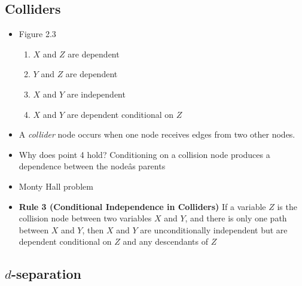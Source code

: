 \documentclass[]{article}
\providecommand{\tightlist}{%
  \setlength{\itemsep}{0pt}\setlength{\parskip}{0pt}}
\begin{document}
\subsection{Colliders}\label{colliders}

\begin{itemize}
\item
  Figure 2.3

  \begin{enumerate}
  \def\labelenumi{\arabic{enumi}.}
  \tightlist
  \item
    \(X\) and \(Z\) are dependent
  \item
    \(Y\) and \(Z\) are dependent
  \item
    \(X\) and \(Y\) are independent
  \item
    \(X\) and \(Y\) are dependent conditional on \(Z\)
  \end{enumerate}
\item
  A \emph{collider} node occurs when one node receives edges from two
  other nodes.
\item
  Why does point 4 hold? Conditioning on a collision node produces a
  dependence between the nodeâs parents
\item
  Monty Hall problem
\item
  \textbf{Rule 3 (Conditional Independence in Colliders)} If a variable
  \(Z\) is the collision node between two variables \(X\) and \(Y\), and
  there is only one path between \(X\) and \(Y\), then \(X\) and \(Y\)
  are unconditionally independent but are dependent conditional on \(Z\)
  and any descendants of \(Z\)
\end{itemize}

\subsection{\texorpdfstring{\(d\)-separation}{d-separation}}\label{d-separation}
\end{document}
